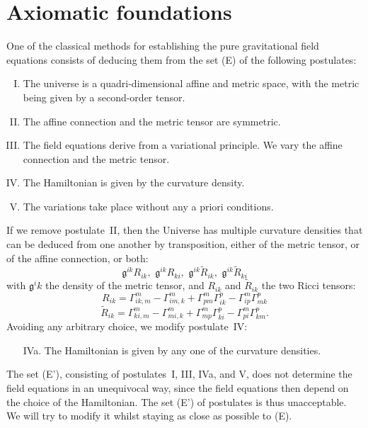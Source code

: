\documentclass{article}
\renewcommand{\gg}{\mathfrak{g}}
\newcommand{\oldpage}[1]{\marginpar{\footnotesize$\Big\vert$ \textit{p.~#1}}}
\begin{document}
\section{Axiomatic foundations}
\label{section1}

One of the classical methods for establishing the pure gravitational field equations consists of deducing them from the set (E) of the following postulates:
\begin{enumerate}[I.]
  \item The universe is a quadri-dimensional affine and metric space, with the metric being given by a second-order tensor.
  \item The affine connection and the metric tensor are symmetric.
  \item The field equations derive from a variational principle.
\oldpage{10-02}
    We vary the affine connection and the metric tensor.
  \item The Hamiltonian is given by the curvature density.
  \item The variations take place without any a priori conditions.
\end{enumerate}

If we remove postulate~II, then the Universe has multiple curvature densities that can be deduced from one another by transposition, either of the metric tensor, or of the affine connection, or both:
\[
  \gg^{ik}R_{ik}, \,\,
  \gg^{ik}R_{ki}, \,\,
  \gg^{ik}\widetilde{R}_{ik}, \,\,
  \gg^{ik}\widetilde{R}_{ki}
\]
with $\gg^ik$ the density of the metric tensor, and $R_{ik}$ and $\widetilde{R}_{ik}$ the two Ricci tensors:
\[
\label{equation1}
  R_{ik} = \Gamma_{ik,m}^m - \Gamma_{im,k}^m + \Gamma_{pm}^m\Gamma_{ik}^p - \Gamma_{ip}^m\Gamma_{mk}^p
  \tag{1}
\]
\[
\label{equation2}
  \widetilde{R}_{ik} = \Gamma_{ki,m}^m - \Gamma_{mi,k}^m + \Gamma_{mp}^m\Gamma_{ki}^p - \Gamma_{pi}^m\Gamma_{km}^p.
  \tag{2}
\]
Avoiding any arbitrary choice, we modify postulate~IV:
\begin{enumerate}
  \item[IVa.] The Hamiltonian is given by any one of the curvature densities.
\end{enumerate}

The set (E'), consisting of postulates~I, III, IVa, and V, does not determine the field equations in an unequivocal way, since the field equations then depend on the choice of the Hamiltonian.
The set (E') of postulates is thus unacceptable.
We will try to modify it whilst staying as close as possible to (E).
\end{document}
